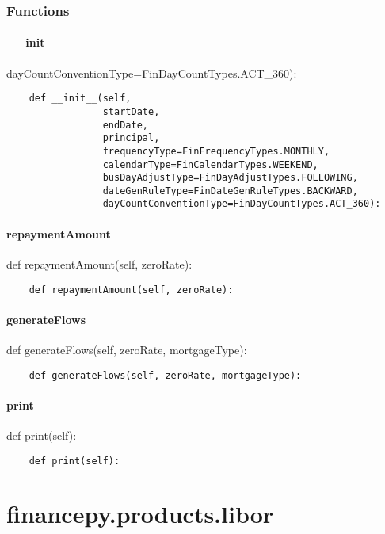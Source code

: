 \documentclass[twoside,11pt]{book}
\begin{document}
\subsection*{Functions}

\subsubsection*{{\bf \_\_init\_\_}}
dayCountConventionType=FinDayCountTypes.ACT\_360): 

\begin{lstlisting}
    def __init__(self,
                 startDate,
                 endDate,
                 principal,
                 frequencyType=FinFrequencyTypes.MONTHLY,
                 calendarType=FinCalendarTypes.WEEKEND,
                 busDayAdjustType=FinDayAdjustTypes.FOLLOWING,
                 dateGenRuleType=FinDateGenRuleTypes.BACKWARD,
                 dayCountConventionType=FinDayCountTypes.ACT_360):
\end{lstlisting}

\subsubsection*{{\bf repaymentAmount}}
def repaymentAmount(self, zeroRate): 

\begin{lstlisting}
    def repaymentAmount(self, zeroRate):
\end{lstlisting}

\subsubsection*{{\bf generateFlows}}
def generateFlows(self, zeroRate, mortgageType): 

\begin{lstlisting}
    def generateFlows(self, zeroRate, mortgageType):
\end{lstlisting}

\subsubsection*{{\bf print}}
def print(self): 

\begin{lstlisting}
    def print(self):
\end{lstlisting}


\chapter{financepy.products.libor}
\end{document}
